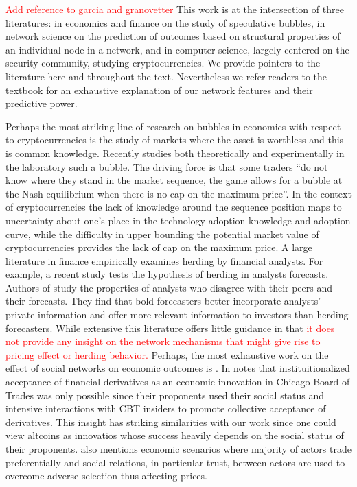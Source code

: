 \textcolor{red}{Add reference to garcia and granovetter}
This work is at the intersection of three literatures: in economics and finance on the study of speculative bubbles, in network science on the prediction of outcomes based on structural properties of an individual node in a network, and in computer science, largely centered on the security community, studying cryptocurrencies.
We provide pointers to the literature here and throughout the text. Nevertheless we refer readers to the textbook \cite{KleinbergNetworks} for an exhaustive explanation of our network features and their predictive power.

Perhaps the most striking line of research on bubbles in economics with respect to cryptocurrencies is the study of markets where the asset is worthless and this is common knowledge. 
Recently \cite{moinas2013bubble} studies both theoretically and experimentally in the laboratory such a bubble. 
The driving force is that some traders ``do not know where they stand in the market sequence, the game allows for
a bubble at the Nash equilibrium when there is no cap on the maximum price''.
In the context of cryptocurrencies the lack of knowledge around the sequence position maps to uncertainty about one's place in the technology adoption knowledge and adoption curve, while the difficulty in upper bounding the potential market value of cryptocurrencies provides the lack of cap on the maximum price. 
A large literature in finance empirically examines herding by financial analysts. For example, a recent study \cite{jegadeesh2009analysts} tests the hypothesis of herding in analysts forecasts. 
Authors of \cite{clement2005financial} study the properties of analysts who disagree with their peers and their forecasts. They find that bold forecasters better incorporate analysts' private information and offer more relevant information to investors than herding forecasters.
While extensive this literature offers little guidance in that \textcolor{red}{it does not provide any insight on the network mechanisms that might give rise to pricing effect or herding behavior.} Perhaps, the most exhaustive work on the effect of social networks on economic outcomes is \cite{Granovetter-outcomes}. In \cite{Granovetter-outcomes} notes that instituitionalized acceptance of financial derivatives as an economic innovation in Chicago Board of Trades was only possible since their proponents used their social status and intensive interactions with CBT insiders to promote collective acceptance of derivatives. This insight has striking similarities with our work since one could view altcoins as innovatios whose success heavily depends on the social status of their proponents. \cite{Granovetter-outcomes} also mentions economic scenarios where majority of actors trade preferentially and social relations, in particular trust, between actors are used to overcome adverse selection thus affecting prices.

